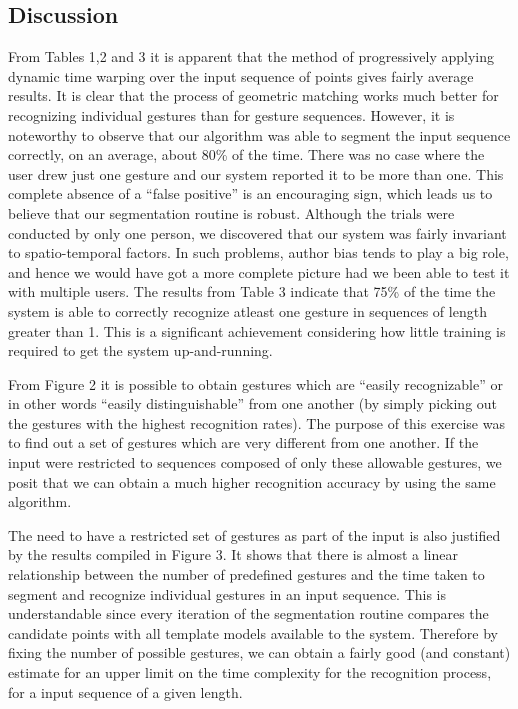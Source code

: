 \documentclass[twoside]{article}
\begin{document}
\begin{multicols}{2}
\section{Discussion}

From Tables 1,2 and 3 it is apparent that the method of progressively applying dynamic time warping over the input sequence of points gives fairly average results. It is clear that the process of geometric matching works much better for recognizing individual gestures than for gesture sequences. However, it is noteworthy to observe that our algorithm was able to segment the input sequence correctly, on an average, about 80\% of the time. There was no case where the user drew just one gesture and our system reported it to be more than one. This complete absence of a ``false positive'' is an encouraging sign, which leads us to believe that our segmentation routine is robust. Although the trials were conducted by only one person, we discovered that our system was fairly invariant to spatio-temporal factors. In such problems, author bias tends to play a big role, and hence we would have got a more complete picture had we been able to test it with multiple users. The results from Table 3 indicate that 75\% of the time the system is able to correctly recognize atleast one gesture in sequences of length greater than 1. This is a significant achievement considering how little training is required to get the system up-and-running.

From Figure 2 it is possible to obtain gestures which are ``easily recognizable'' or in other words ``easily distinguishable'' from one another (by simply picking out the gestures with the highest recognition rates). 
The purpose of this exercise was to find out a set of gestures which are very different from one another. If the input were restricted to sequences composed of only these allowable gestures, we posit that we can obtain a much higher recognition accuracy by using the same algorithm.

The need to have a restricted set of gestures as part of the input is also justified by the results compiled in Figure 3. It shows that there is almost a linear relationship between the number of predefined gestures and the time taken to segment and recognize individual gestures in an input sequence. This is understandable since every iteration of the segmentation routine compares the candidate points with all template models available to the system. Therefore by fixing the number of possible gestures, we can obtain a fairly good (and constant) estimate for an upper limit on the time complexity for the recognition process, for a input sequence of a given length.


\end{multicols}
\end{document}
